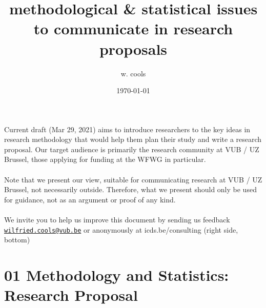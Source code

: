 \documentclass[
]{article}
\title{methodological \& statistical issues\\
to communicate in research proposals\\}
\author{w. cools}
\date{\today}
\begin{document}
\maketitle

Current draft (Mar 29, 2021) aims to introduce researchers to the key
ideas in research methodology that would help them plan their study and
write a research proposal. Our target audience is primarily the research
community at VUB / UZ Brussel, those applying for funding at the WFWG in
particular.\\
~\\
Note that we present our view, suitable for communicating research at
VUB / UZ Brussel, not necessarily outside. Therefore, what we present
should only be used for guidance, not as an argument or proof of any
kind.\\
~\\
We invite you to help us improve this document by sending us feedback
\href{mailto:wilfried.cools@vub.be}{\nolinkurl{wilfried.cools@vub.be}}
or anonymously at icds.be/consulting (right side, bottom)

\newpage

\hypertarget{methodology-and-statistics-research-proposal}{%
\section{01 Methodology and Statistics: Research
Proposal}\label{methodology-and-statistics-research-proposal}}
\end{document}
